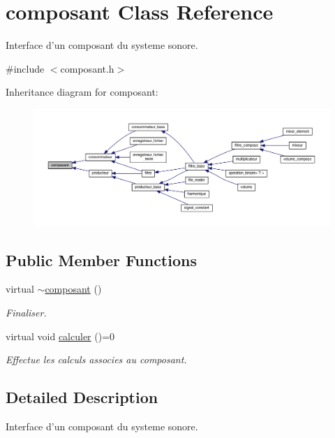 \hypertarget{classcomposant}{\section{composant Class Reference}
\label{classcomposant}
}


Interface d'un composant du systeme sonore.  




{\ttfamily \#include $<$composant.\-h$>$}



Inheritance diagram for composant\-:
\nopagebreak
\begin{figure}[H]
\begin{center}
\leavevmode
\includegraphics[width=350pt]{classcomposant__inherit__graph}
\end{center}
\end{figure}
\subsection*{Public Member Functions}
\begin{DoxyCompactItemize}
\item 
virtual \hyperlink{classcomposant_add8126876f9df35cc359f887396f0966}{$\sim$composant} ()
\begin{DoxyCompactList}\small\item\em Finaliser. \end{DoxyCompactList}\item 
virtual void \hyperlink{classcomposant_a257333d140850f51be479b025ce1e540}{calculer} ()=0
\begin{DoxyCompactList}\small\item\em Effectue les calculs associes au composant. \end{DoxyCompactList}\end{DoxyCompactItemize}


\subsection{Detailed Description}
Interface d'un composant du systeme sonore. 

